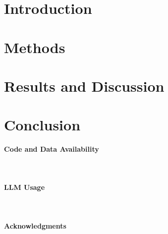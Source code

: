 \documentclass[journal=eds]{CUP-PN}%
\theoremstyle{definition}
\numberwithin{equation}{section}
\newcommand{\detailtexcount}[1]{%
  \immediate\write18{texcount -merge -sum -q #1.tex > #1.wcdetail }%
}
\begin{document}

\clearpage
\linenumbers

\section{Introduction}
\label{sec:introduction}


\clearpage

\section{Methods}
\label{sec:methods}


\clearpage

\section{Results and Discussion}
\label{sec:results_and_discussion}


\clearpage

\section{Conclusion}
\label{sec:conclusion}


\clearpage

\begin{Backmatter}

\paragraph{Code and Data Availability}~%


\paragraph{LLM Usage}~%


\paragraph{Acknowledgments}~%


% 
\printbibliography

\begin{appendix}

\renewcommand\thesection{Appendix \Alph{section}}
\renewcommand\thesubsection{\Alph{section}.\arabic{subsection}} 
\renewcommand\thetable{\Alph{section}.\arabic{table}}  
\renewcommand\thefigure{\Alph{section}.\arabic{figure}}  
\setcounter{table}{0}
\setcounter{figure}{0}


\label{app:additional_methods}

\clearpage

\normalsize


\label{app:additional_results}

\end{appendix}

\end{Backmatter}

\clearpage

\end{document}
